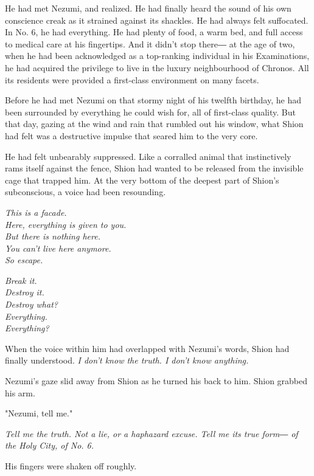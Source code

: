 He had met Nezumi, and realized. He had finally heard the sound of his
own conscience creak as it strained against its shackles. He had always
felt suffocated. In No. 6, he had everything. He had plenty of food, a
warm bed, and full access to medical care at his fingertips. And it
didn't stop there― at the age of two, when he had been acknowledged as a
top-ranking individual in his Examinations, he had acquired the
privilege to live in the luxury neighbourhood of Chronos. All its
residents were provided a first-class environment on many facets.

Before he had met Nezumi on that stormy night of his twelfth birthday,
he had been surrounded by everything he could wish for, all of
first-class quality. But that day, gazing at the wind and rain that
rumbled out his window, what Shion had felt was a destructive impulse
that seared him to the very core.

He had felt unbearably suppressed. Like a corralled animal that
instinctively rams itself against the fence, Shion had wanted to be
released from the invisible cage that trapped him. At the very bottom of
the deepest part of Shion's subconscious, a voice had been resounding.

\myspace

\emph{This is a facade.\\
	Here, everything is given to you.\\
	But there is nothing here.\\
	You can't live here anymore.\\
	So escape.}

\myspace

\emph{Break it.\\
	Destroy it.\\
	Destroy what?\\
	Everything.\\
	Everything?}

\myspace

When the voice within him had overlapped with Nezumi's words, Shion had
finally understood. \emph{I don't know the truth. I don't know anything.}

Nezumi's gaze slid away from Shion as he turned his back to him. Shion
grabbed his arm.

"Nezumi, tell me."

\emph{Tell me the truth. Not a lie, or a haphazard excuse. Tell me its true
	form― of the Holy City, of No. 6.}

His fingers were shaken off roughly.

